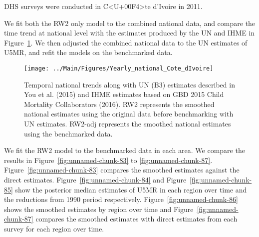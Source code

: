 \documentclass[12pt]{article}\usepackage[]{graphicx}\usepackage[]{color}
\newenvironment{knitrout}{}{} %
\begin{document}


DHS surveys were conducted in C<U+00F4>te d'Ivoire in 2011.

We fit both the RW2 only model to the combined national data, and compare the time trend at national level with the estimates produced by the UN and IHME in Figure~\ref{fig:unnamed-chunk-82}. We then adjusted the combined national data to the UN estimates of U5MR, and refit the models on the benchmarked data. 

\begin{knitrout}
\color{fgcolor}\begin{figure}[bht]

{\centering \texttt{[image: ../Main/Figures/Yearly\_national\_Cote\_dIvoire]} 

}

\caption[Temporal national trends along with UN (B3) estimates described in You et al]{Temporal national trends along with UN (B3) estimates described in You et al. (2015) and IHME estimates based on GBD 2015 Child Mortality Collaborators (2016). RW2 represents the smoothed national estimates using the original data before benchmarking with UN estimates. RW2-adj represents the smoothed national estimates using the benchmarked data.}\label{fig:unnamed-chunk-82}
\end{figure}


\end{knitrout}
 

We fit the RW2 model to the benchmarked data in each area. 
We compare the results in Figure~\ref{fig:unnamed-chunk-83} to \ref{fig:unnamed-chunk-87}.
Figure~\ref{fig:unnamed-chunk-83} compares the smoothed estimates against the direct estimates. Figure~\ref{fig:unnamed-chunk-84} and Figure~\ref{fig:unnamed-chunk-85} show the posterior median estimates of U5MR in each region over time and the reductions from 1990 period respectively.
Figure~\ref{fig:unnamed-chunk-86} shows the smoothed estimates by region over time and Figure~\ref{fig:unnamed-chunk-87} compares the smoothed estimates with direct estimates from each survey for each region over time.


\end{document}
